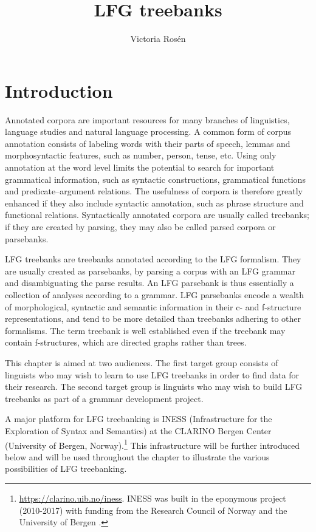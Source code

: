 \documentclass[output=paper,hidelinks]{langscibook}
\title{LFG treebanks}
\author{Victoria Rosén\affiliation{University of Bergen}}
\begin{document}
\maketitle
\label{chap:Treebanks}

\section{Introduction}\label{intro} 



Annotated corpora are important resources for many branches of linguistics, language studies and natural language processing.
A common form of corpus annotation consists of labeling words with their parts of speech, lemmas and morphosyntactic features, such as number, person, tense, etc.
Using only annotation at the word level limits the potential to search for important grammatical information, such as syntactic constructions, grammatical functions and predicate–argument relations.
The usefulness of corpora is therefore greatly enhanced if they also include syntactic annotation, such as phrase structure and functional relations.
Syntactically annotated corpora are usually called treebanks; if they are created by parsing, they may also be called parsed corpora or parsebanks.

LFG treebanks are treebanks annotated according to the LFG formalism. 
They are usually created as parsebanks, by parsing a corpus with an LFG grammar and disambiguating the parse results.
An LFG parsebank is thus essentially a collection of analyses according to a grammar.
LFG parsebanks encode a wealth of morphological, syntactic and semantic information in their c- and f-structure representations, and tend to be more detailed than treebanks adhering to other formalisms.
The term treebank is well established even if the treebank may contain f-structures, which are directed graphs rather than trees.

This chapter is aimed at two audiences.
The first target group consists of linguists who may wish to learn to use LFG treebanks in order to find data for their research.
The second target group is linguists who may wish to build LFG treebanks as part of a grammar development project.

A major platform for LFG treebanking is INESS (Infrastructure for the Exploration of Syntax and Semantics) at the CLARINO Bergen Center (University of Bergen, Norway).\footnote{\url{https://clarino.uib.no/iness}.  INESS was built
in the eponymous project (2010-2017)
with funding from the Research Council of Norway
and the University of Bergen
\citep{rosen-desmedt-meurer-dyvik12,Meurer13}.} %
This infrastructure will be further introduced below and will be used throughout the chapter to illustrate the various possibilities of LFG treebanking.
\end{document}
